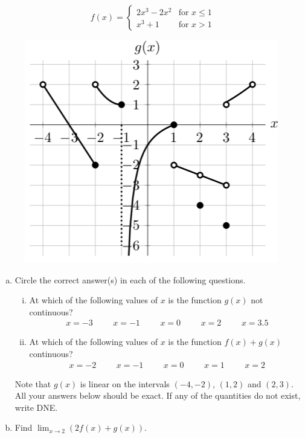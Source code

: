 \documentclass[11pt]{exam}
\begin{document}
\begin{questions}
$$f(x) = \left\lbrace \begin{array}{ll} 2x^3-2x^2 & \textrm{for } x \leqslant 1 \\x^3 + 1 & \textrm{for } x > 1 \end{array} \right.$$

  \begin{figure}[h]
    \centering
    \includegraphics[scale=0.5]{discontinuities}
  \end{figure}

\begin{enumerate}[(a)]
\item Circle the correct answer(s) in each of the following questions.
\begin{enumerate}[(i)]
\item At which of the following values of $x$ is the function $g(x)$ not continuous?
$$\begin{array}{ccccccccccccc}
x = -3 &&& x = -1 &&& x = 0 &&& x = 2 &&& x = 3.5
\end{array}$$
\item At which of the following values of $x$ is the function $f(x) + g(x)$ continuous?
$$\begin{array}{ccccccccccccc}
x = -2 &&& x = -1 &&& x = 0 &&& x = 1 &&& x = 2
\end{array}$$

\end{enumerate}
Note that $g(x)$ is linear on the intervals $(-4,-2)$, $(1,2)$ and $(2, 3)$. All your answers below should be exact. If any of the quantities do not exist, write DNE.

\item Find $\displaystyle\lim_{x \rightarrow 2} (2f(x)+g(x))$.


\end{enumerate}
\end{questions}
\end{document}
